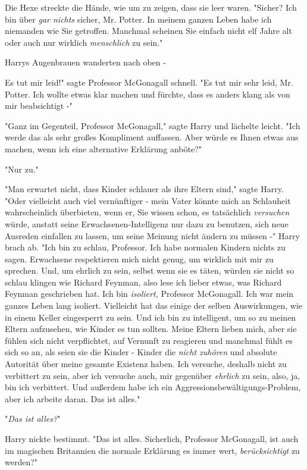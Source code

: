 {Die Hexe streckte die Hände, wie um zu zeigen, dass sie leer waren. "Sicher? Ich bin über \emph{gar nichts} sicher, Mr. Potter. In meinem ganzen Leben habe ich niemanden wie Sie getroffen. Manchmal scheinen Sie einfach nicht elf Jahre alt oder auch nur wirklich \emph{menschlich} zu sein."

Harrys Augenbrauen wanderten nach oben -

Es tut mir leid!" sagte Professor McGonagall schnell. "Es tut mir sehr leid, Mr. Potter. Ich wollte etwas klar machen und fürchte, dass es anders klang als von mir beabsichtigt -"

"Ganz im Gegenteil, Professor McGonagall," sagte Harry und lächelte leicht. "Ich werde das als sehr großes Kompliment auffassen. Aber würde es Ihnen etwas aus machen, wenn ich eine alternative Erklärung anböte?"

"Nur zu."

"Man erwartet nicht, dass Kinder schlauer als ihre Eltern sind," sagte Harry. "Oder vielleicht auch viel vernünftiger - mein Vater könnte mich an Schlauheit wahrscheinlich überbieten, wenn er, Sie wissen schon, es tatsächlich \emph{versuchen} würde, anstatt seine Erwachsenen-Intelligenz nur dazu zu benutzen, sich neue Ausreden einfallen zu lassen, um seine Meinung nicht ändern zu müssen -" Harry brach ab. "Ich bin zu schlau, Professor. Ich habe normalen Kindern nichts zu sagen. Erwachsene respektieren mich nicht genug, um wirklich mit mir zu sprechen. Und, um ehrlich zu sein, selbst wenn sie es täten, würden sie nicht so schlau klingen wie Richard Feynman, also lese ich lieber etwas, was Richard Feynman geschrieben hat. Ich bin \emph{isoliert,} Professor McGonagall. Ich war mein ganzes Leben lang isoliert. Vielleicht hat das einige der selben Auswirkungen, wie in einem Keller eingesperrt zu sein. Und ich bin zu intelligent, um so zu meinen Eltern aufzusehen, wie Kinder es tun sollten. Meine Eltern lieben mich, aber sie fühlen sich nicht verpflichtet, auf Vernunft zu reagieren und manchmal fühlt es sich so an, als seien sie die Kinder - Kinder die \emph{nicht zuhören} und absolute Autorität über meine gesamte Existenz haben. Ich versuche, deshalb nicht zu verbittert zu sein, aber ich versuche auch, mir gegenüber \emph{ehrlich} zu sein, also, ja, bin ich verbittert. Und außerdem habe ich ein Aggressionsbewältigungs-Problem, aber ich arbeite daran. Das ist alles."

"\emph{Das ist alles?}"

Harry nickte bestimmt. "Das ist alles. Sicherlich, Professor McGonagall, ist auch im magischen Britannien die normale Erklärung es immer wert, \emph{berücksichtigt} zu werden?"

}

